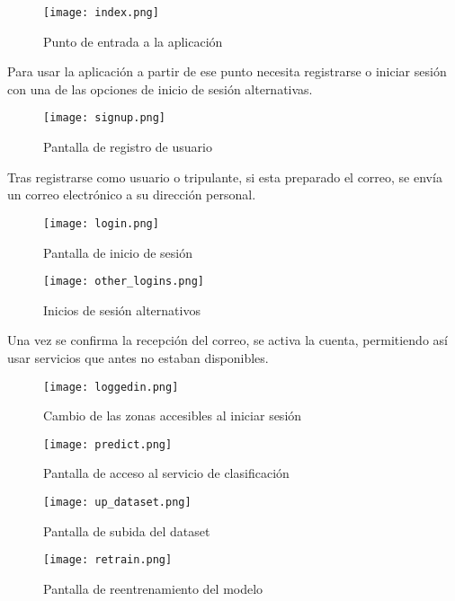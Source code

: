 \begin{figure}
	\centering
	\texttt{[image: index.png]}
	\caption{Punto de entrada a la aplicación}\label{fig:index.png}
\end{figure}

Para usar la aplicación a partir de ese punto necesita registrarse o iniciar sesión con una de las opciones de inicio de sesión alternativas.
\begin{figure}
	\centering
	\texttt{[image: signup.png]}
	\caption{Pantalla de registro de usuario}\label{fig:signup.png}
\end{figure}

Tras registrarse como usuario o tripulante, si esta preparado el correo, se envía un correo electrónico a su dirección personal.
\begin{figure}
	\centering
	\texttt{[image: login.png]}
	\caption{Pantalla de inicio de sesión}\label{fig:login.png}
\end{figure}

\begin{figure}
	\centering
	\texttt{[image: other\_logins.png]}
	\caption{Inicios de sesión alternativos}\label{fig:other_logins.png}
\end{figure}

\FloatBarrier
Una vez se confirma la recepción del correo, se activa la cuenta, permitiendo así usar servicios que antes no estaban disponibles.

\begin{figure}
	\centering
	\texttt{[image: loggedin.png]}
	\caption{Cambio de las zonas accesibles al iniciar sesión}\label{fig:loggedin.png}
\end{figure}


\begin{figure}
	\centering
	\texttt{[image: predict.png]}
	\caption{Pantalla de acceso al servicio de clasificación}\label{fig:predict.png}
\end{figure}

\begin{figure}
	\centering
	\texttt{[image: up\_dataset.png]}
	\caption{Pantalla de subida del dataset}\label{fig:up_dataset.png}
\end{figure}


\begin{figure}
	\centering
	\texttt{[image: retrain.png]}
	\caption{Pantalla de reentrenamiento del modelo}\label{fig:retrain.png}
\end{figure}


